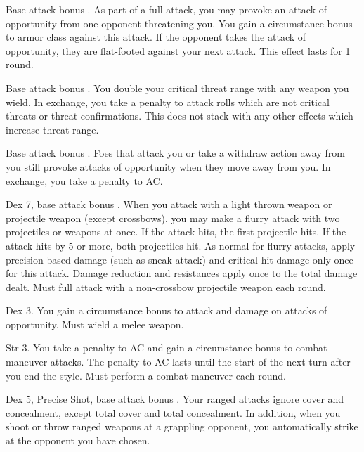 \featpre Base attack bonus .
\featben As part of a full attack, you may provoke an attack of opportunity from one opponent threatening you. You gain a  circumstance bonus to armor class against this attack. If the opponent takes the attack of opportunity, they are flat-footed against your next attack. This effect lasts for 1 round.

 Base attack bonus .
 You double your critical threat range with any weapon you wield. In exchange, you take a  penalty to attack rolls which are not critical threats or threat confirmations. This does not stack with any other effects which increase threat range.

\featpre Base attack bonus .
\featben Foes that attack you or take a withdraw action away from you still provoke attacks of opportunity when they move away from you. In exchange, you take a  penalty to AC.

 Dex 7, base attack bonus .
 When you attack with a light thrown weapon or projectile weapon (except crossbows), you may make a flurry attack with two projectiles or weapons at once. If the attack hits, the first projectile hits. If the attack hits by 5 or more, both projectiles hit. As normal for flurry attacks, apply precision-based damage (such as sneak attack) and critical hit damage only once for this attack. Damage reduction and resistances apply once to the total damage dealt.
 Must full attack with a non-crossbow projectile weapon each round.

 Dex 3.
 You gain a  circumstance bonus to attack and damage on attacks of opportunity. \babscalingdescription
{} Must wield a melee weapon.

 Str 3.
 You take a  penalty to AC and gain a  circumstance bonus to combat maneuver attacks. \babscalingdescription The penalty to AC lasts until the start of the next turn after you end the style.
 Must perform a combat maneuver each round.

 Dex 5, Precise Shot, base attack bonus .
 Your ranged attacks ignore cover and concealment, except total cover and total concealment. In addition, when you shoot or throw ranged weapons at a grappling opponent, you automatically strike at the opponent you have chosen.

